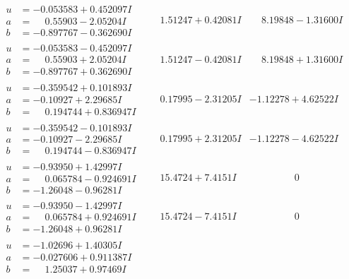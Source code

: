 \documentclass[1p]{elsarticle_modified}
\theoremstyle{definition}
\begin{document}
$$\begin{array}{c|c|c}
\begin{aligned}
u &= -0.053583 + 0.452097 I \\
a &= \phantom{-}0.55903 - 2.05204 I \\
b &= -0.897767 - 0.362690 I\end{aligned}
 & \phantom{-}1.51247 + 0.42081 I & \phantom{-}8.19848 - 1.31600 I \\ \hline\begin{aligned}
u &= -0.053583 - 0.452097 I \\
a &= \phantom{-}0.55903 + 2.05204 I \\
b &= -0.897767 + 0.362690 I\end{aligned}
 & \phantom{-}1.51247 - 0.42081 I & \phantom{-}8.19848 + 1.31600 I \\ \hline\begin{aligned}
u &= -0.359542 + 0.101893 I \\
a &= -0.10927 + 2.29685 I \\
b &= \phantom{-}0.194744 + 0.836947 I\end{aligned}
 & \phantom{-}0.17995 - 2.31205 I & -1.12278 + 4.62522 I \\ \hline\begin{aligned}
u &= -0.359542 - 0.101893 I \\
a &= -0.10927 - 2.29685 I \\
b &= \phantom{-}0.194744 - 0.836947 I\end{aligned}
 & \phantom{-}0.17995 + 2.31205 I & -1.12278 - 4.62522 I \\ \hline\begin{aligned}
u &= -0.93950 + 1.42997 I \\
a &= \phantom{-}0.065784 - 0.924691 I \\
b &= -1.26048 - 0.96281 I\end{aligned}
 & \phantom{-}15.4724 + 7.4151 I & \phantom{-0.000000 } 0 \\ \hline\begin{aligned}
u &= -0.93950 - 1.42997 I \\
a &= \phantom{-}0.065784 + 0.924691 I \\
b &= -1.26048 + 0.96281 I\end{aligned}
 & \phantom{-}15.4724 - 7.4151 I & \phantom{-0.000000 } 0 \\ \hline\begin{aligned}
u &= -1.02696 + 1.40305 I \\
a &= -0.027606 + 0.911387 I \\
b &= \phantom{-}1.25037 + 0.97469 I\end{aligned}

\end{array}$$
\end{document}
